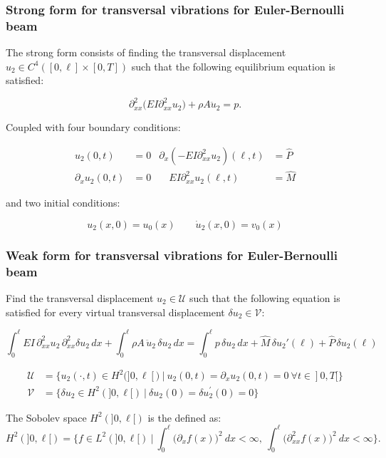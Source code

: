 \documentclass[aspectratio=169]{beamer}
\begin{document}
\begin{frame}
  \frametitle{Strong form for transversal vibrations for Euler-Bernoulli beam}
  The strong form consists of finding the transversal displacement $u_{2}\in C^4([0,\ell]\times[0,T])$ such that the following equilibrium equation is satisfied:
  \begin{block}{}
    $$\partial_{xx}^2\big(EI\partial_{xx}^2u_{2}\big)+\rho A\ddot u_{2}=p.$$
  \end{block}
  Coupled with four boundary conditions:
  \begin{block}{}
    \vspace{-0.5cm}
    \begin{align*}
      u_2(0,t)                                             & =0       &
      \partial_x\left(-EI\partial_{xx}^2u_2\right)(\ell,t) & = \hat P   \\
      \partial_{x}u_{2}(0,t)                               & =0       &
      \quad EI\partial_{xx}^2u_{2}(\ell,t)                 & = \hat M
    \end{align*}
  \end{block}
  and two initial conditions:
  \begin{block}{}
    $$u_2(x,0)=u_{0}(x)\qquad \dot u_2(x,0)=v_{0}(x)$$
  \end{block}
\end{frame}


\begin{frame}
  \frametitle{Weak form for transversal vibrations for Euler-Bernoulli beam}
  Find the transversal displacement $u_{2}\in \mathcal U$ such that the following equation is satisfied for every virtual transversal displacement $\delta u_2\in \mathcal V$:
  \begin{block}{}
    \vspace{-0.5cm}\[
      \int_0^\ell EI\, \partial_{xx}^2 u_2 \, \partial_{xx}^2 \delta u_2 \, dx + \int_0^\ell \rho A\, \ddot u_2 \, \delta u_2 \, dx = \int_0^\ell p\, \delta u_2 \, dx + \hat M\, \delta u_2'(\ell) + \hat P\, \delta u_2(\ell)
    \]

    \vspace{-0.5cm}
    \begin{align*}
      \mathcal U & =\big\{u_2(\cdot,t)\in H^2(]0,\ell[)\ |\ u_2(0,t)=\partial_{x}u_{2}(0,t)=0\ \forall t\in]0,T[\big\} \\
      \mathcal V & =\big\{\delta u_2\in H^2(]0,\ell[)\ |\ \delta u_2(0)=\delta u_{2}^\prime(0)=0 \big\}
    \end{align*}
  \end{block}
  \vspace{0.2cm}
  The Sobolev space $H^2(]0,\ell[)$ is the defined as:
    $$H^2(]0,\ell[)=\Big\{f\in L^2(]0,\ell[)\ |\ \int_0^\ell \big(\partial_{x}f(x)\big)^2 \ dx<\infty, \ \int_0^\ell \big(\partial_{xx}^2f(x)\big)^2 \ dx<\infty  \Big\}.$$
\end{frame}
\end{document}
